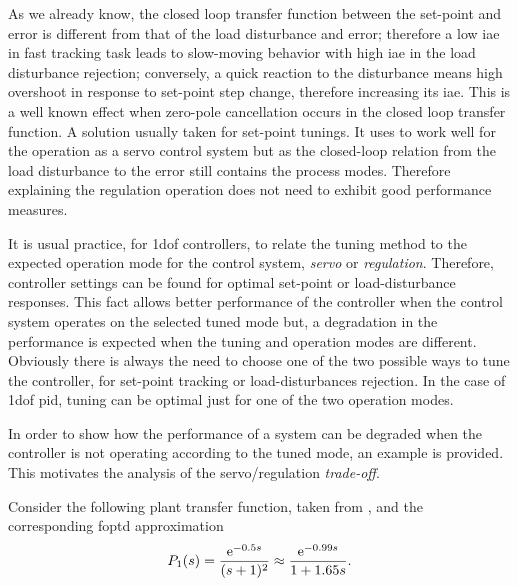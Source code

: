As we already know, the closed loop transfer function between the set-point and error is different from that of the load disturbance and error; therefore a low \gls{iae} in fast tracking task leads to slow-moving behavior with high \gls{iae} in the load disturbance rejection; conversely, a quick reaction to the disturbance means high overshoot in response to set-point step change, therefore increasing its \gls{iae}. This is a well known effect when zero-pole cancellation occurs in the closed loop transfer function. A solution usually taken for set-point tunings. It uses to work well for the operation as a servo control system but as the closed-loop relation from the load disturbance to the error still contains the process modes. Therefore explaining the regulation operation does not need to exhibit good performance measures.
 
It is usual practice, for \gls{1dof} controllers, to relate the tuning method to the expected operation mode for the control system, \emph{servo} or \emph{regulation}. Therefore, controller settings can be found for optimal set-point or load-disturbance responses. This fact allows better performance of the controller when the control system operates on the selected tuned mode but, a degradation in the performance is expected when the tuning and operation modes are different. Obviously there is always the need to choose one of the two possible ways to tune the controller, for set-point tracking or load-disturbances rejection. In the case of \gls{1dof} \gls{pid}, tuning can be optimal just for one of the two operation modes.

In order to show how the performance of a system can be degraded when the controller is not operating according to the tuned mode, an example is provided. This motivates the analysis of the servo/regulation \emph{trade-off}.

Consider the following plant transfer function, taken from \citet{zhuang1993}, and the corresponding \gls{foptd} approximation 
%
\begin{equation}
P_1(s)=\frac{\mathrm{e}^{-0.5s}}{(s+1)^2} \approx \frac{\mathrm{e}^{-0.99s}}{1+1.65s}. \label{system_example} 
\end{equation}

